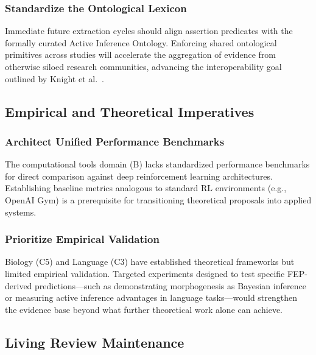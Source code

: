 \documentclass[
  english,
]{article}
\begin{document}
\subsubsection{Standardize the Ontological
Lexicon}\label{standardize-the-ontological-lexicon}

Immediate future extraction cycles should align assertion predicates
with the formally curated Active Inference Ontology. Enforcing shared
ontological primitives across studies will accelerate the aggregation of
evidence from otherwise siloed research communities, advancing the
interoperability goal outlined by Knight et al.~\citep{knight2022fep}.

\subsection{Empirical and Theoretical
Imperatives}\label{empirical-and-theoretical-imperatives}

\subsubsection{Architect Unified Performance
Benchmarks}\label{architect-unified-performance-benchmarks}

The computational tools domain (B) lacks standardized performance
benchmarks for direct comparison against deep reinforcement learning
architectures. Establishing baseline metrics analogous to standard RL
environments (e.g., OpenAI Gym) is a prerequisite for transitioning
theoretical proposals into applied systems.

\subsubsection{Prioritize Empirical
Validation}\label{prioritize-empirical-validation}

Biology (C5) and Language (C3) have established theoretical frameworks
but limited empirical validation. Targeted experiments designed to test
specific FEP-derived predictions---such as demonstrating morphogenesis
as Bayesian inference or measuring active inference advantages in
language tasks---would strengthen the evidence base beyond what further
theoretical work alone can achieve.

\subsection{Living Review Maintenance}\label{living-review-maintenance}
\end{document}
